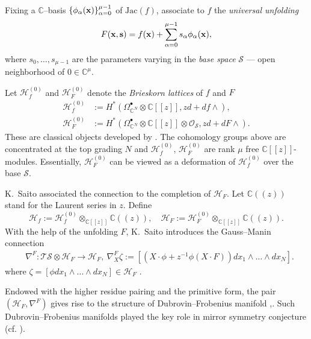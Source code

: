 \documentclass[reqno,12pt]{amsart}
\numberwithin{equation}{section}
\theoremstyle{plain}
\theoremstyle{definition}
\newcommand{\CC}{{\mathbb{C}}}
\newcommand{\Jac}{\mathrm{Jac}}
\newcommand{\bx}{{\bf x}}
\def\H{{\mathcal H}}
\def\O{{\mathcal O}}
\numberwithin{equation}{section}
\begin{document}
Fixing a $\CC$--basis $\{\phi_{\alpha}(\bx)\}^{\mu-1}_{\alpha = 0}$ of $\Jac(f)$, associate to $f$ the \emph{universal unfolding}
\[
    F(\bx,\textbf{s}) = f (\bx)+ \sum^{\mu-1}_{\alpha=0} s_{\alpha} \phi_\alpha(\bx),
\]
where $s_0,\dots,s_{\mu-1}$ are the parameters varying in the \emph{base space} $\mathcal{S}$ --- open neighborhood of $0 \in \CC^\mu$. 

Let $\H_f^{(0)}$ and $\H_F^{(0)}$ denote the \emph{Brieskorn lattices} of $f$ and $F$
\begin{align*}
    \H_f^{(0)} & := H^*(\Omega^{\bullet}_{\CC^N}\otimes \CC[[z]], z d + df\wedge),
    \\ 
    \H_F^{(0)} & := H^*(\Omega^{\bullet}_{\CC^N}\otimes \CC[[z]] \otimes \O_{\mathcal{S}}, z d + dF\wedge).
\end{align*}
These are classical objects developed by \cite{SK81,SK83, SM89}. 
The cohomology groups above are concentrated at the top grading $N$ and $\H_f^{(0)}$, $\H_F^{(0)}$ are rank $\mu$ free $\CC[[z]]$-modules.
Essentially, $\H_F^{(0)}$ can be viewed as a deformation of $\H_f^{(0)}$ over the base $\mathcal{S}$.

K.~Saito associated the connection to the completion of $\H_F$. Let $\CC((z))$ stand for the Laurent series in $z$. Define
\[
    \H_f := \H_f^{(0)} \otimes_{\CC[[z]]} \CC((z)), \quad \H_F := \H_F^{(0)} \otimes_{\CC[[z]]} \CC((z)).
\]
With the help of the unfolding $F$, K.~Saito introduces the Gauss--Manin connection 
\begin{align*}
 & \nabla^F:  \mathcal{TS} \otimes \H_F \to  \H_F,
 \ \nabla^F_X\zeta := \left[ (X \cdot \phi + z^{-1} \phi (X \cdot F)) dx_1 \wedge \dots \wedge dx_N \right].
\end{align*}
where $\zeta = [\phi dx_1 \wedge \dots \wedge dx_N] \in \H_F$ .

Endowed with the higher residue pairing and the primitive form, the pair $(\H_F, \nabla^F)$ gives rise to the structure of Dubrovin--Frobenius manifold \cite{SaiT},\cite{SK83}.
Such Dubrovin--Frobenius manifolds played the key role in mirror symmetry conjecture (cf. \cite{CR11}).
\end{document}
